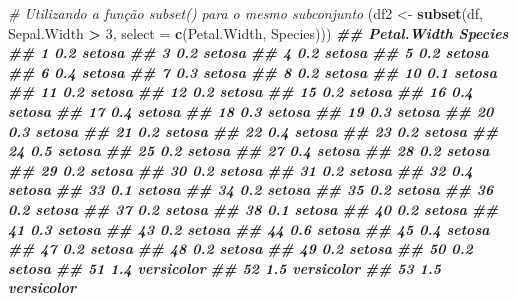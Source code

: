 \documentclass[
]{book}
\newenvironment{Shaded}{\begin{snugshade}}{\end{snugshade}}
\newcommand{\AttributeTok}[1]{\textcolor[rgb]{0.13,0.29,0.53}{#1}}
\newcommand{\CommentTok}[1]{\textcolor[rgb]{0.56,0.35,0.01}{\textit{#1}}}
\newcommand{\DecValTok}[1]{\textcolor[rgb]{0.00,0.00,0.81}{#1}}
\newcommand{\DocumentationTok}[1]{\textcolor[rgb]{0.56,0.35,0.01}{\textbf{\textit{#1}}}}
\newcommand{\FunctionTok}[1]{\textcolor[rgb]{0.13,0.29,0.53}{\textbf{#1}}}
\newcommand{\NormalTok}[1]{#1}
\newcommand{\OtherTok}[1]{\textcolor[rgb]{0.56,0.35,0.01}{#1}}
\newcommand{\SpecialCharTok}[1]{\textcolor[rgb]{0.81,0.36,0.00}{\textbf{#1}}}
\begin{document}
\begin{Shaded}
\begin{Highlighting}[]
\CommentTok{\# Utilizando a função subset() para o mesmo subconjunto  }
\NormalTok{(df2 }\OtherTok{\textless{}{-}} \FunctionTok{subset}\NormalTok{(df, Sepal.Width }\SpecialCharTok{\textgreater{}} \DecValTok{3}\NormalTok{, }\AttributeTok{select =} \FunctionTok{c}\NormalTok{(Petal.Width, Species)))}
\DocumentationTok{\#\#     Petal.Width    Species}
\DocumentationTok{\#\# 1           0.2     setosa}
\DocumentationTok{\#\# 3           0.2     setosa}
\DocumentationTok{\#\# 4           0.2     setosa}
\DocumentationTok{\#\# 5           0.2     setosa}
\DocumentationTok{\#\# 6           0.4     setosa}
\DocumentationTok{\#\# 7           0.3     setosa}
\DocumentationTok{\#\# 8           0.2     setosa}
\DocumentationTok{\#\# 10          0.1     setosa}
\DocumentationTok{\#\# 11          0.2     setosa}
\DocumentationTok{\#\# 12          0.2     setosa}
\DocumentationTok{\#\# 15          0.2     setosa}
\DocumentationTok{\#\# 16          0.4     setosa}
\DocumentationTok{\#\# 17          0.4     setosa}
\DocumentationTok{\#\# 18          0.3     setosa}
\DocumentationTok{\#\# 19          0.3     setosa}
\DocumentationTok{\#\# 20          0.3     setosa}
\DocumentationTok{\#\# 21          0.2     setosa}
\DocumentationTok{\#\# 22          0.4     setosa}
\DocumentationTok{\#\# 23          0.2     setosa}
\DocumentationTok{\#\# 24          0.5     setosa}
\DocumentationTok{\#\# 25          0.2     setosa}
\DocumentationTok{\#\# 27          0.4     setosa}
\DocumentationTok{\#\# 28          0.2     setosa}
\DocumentationTok{\#\# 29          0.2     setosa}
\DocumentationTok{\#\# 30          0.2     setosa}
\DocumentationTok{\#\# 31          0.2     setosa}
\DocumentationTok{\#\# 32          0.4     setosa}
\DocumentationTok{\#\# 33          0.1     setosa}
\DocumentationTok{\#\# 34          0.2     setosa}
\DocumentationTok{\#\# 35          0.2     setosa}
\DocumentationTok{\#\# 36          0.2     setosa}
\DocumentationTok{\#\# 37          0.2     setosa}
\DocumentationTok{\#\# 38          0.1     setosa}
\DocumentationTok{\#\# 40          0.2     setosa}
\DocumentationTok{\#\# 41          0.3     setosa}
\DocumentationTok{\#\# 43          0.2     setosa}
\DocumentationTok{\#\# 44          0.6     setosa}
\DocumentationTok{\#\# 45          0.4     setosa}
\DocumentationTok{\#\# 47          0.2     setosa}
\DocumentationTok{\#\# 48          0.2     setosa}
\DocumentationTok{\#\# 49          0.2     setosa}
\DocumentationTok{\#\# 50          0.2     setosa}
\DocumentationTok{\#\# 51          1.4 versicolor}
\DocumentationTok{\#\# 52          1.5 versicolor}
\DocumentationTok{\#\# 53          1.5 versicolor}

\end{Highlighting}
\end{Shaded}
\end{document}
